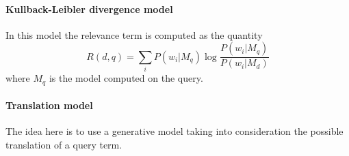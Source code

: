 \paragraph{Kullback-Leibler divergence model}
In this model the relevance term is computed as the quantity 
$$R(d, q) = \sum_i P(w_i|M_q)\log\frac{P(w_i|M_q)}{P(w_i|M_d)}$$
where $M_q$ is the model computed on the query.

\paragraph{Translation model}
The idea here is to use a generative model taking into consideration 
the possible translation of a query term.